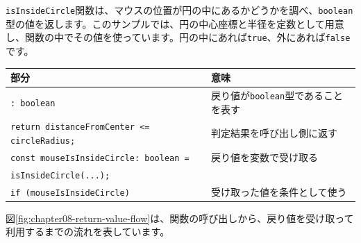 \begin{listing}[htbp]
\inputminted{ts}{typescript-p5/listings/chapter08/point-in-circle-function.ts}
\caption{点が円の中にあるかを返す関数（\texttt{chapter08/point-in-circle-function.ts}）}
\label{lst:chapter08-point-in-circle-function}
\end{listing}

\texttt{isInsideCircle}関数は、マウスの位置が円の中にあるかどうかを調べ、\texttt{boolean}型の値を返します。このサンプルでは、円の中心座標と半径を定数として用意し、関数の中でその値を使っています。円の中にあれば\texttt{true}、外にあれば\texttt{false}です。

{\footnotesize
\begin{center}
\begin{tabular}{ll}
\toprule
部分 & 意味 \\
\midrule
\texttt{: boolean} & 戻り値が\texttt{boolean}型であることを表す \\
\texttt{return distanceFromCenter <= circleRadius;} & 判定結果を呼び出し側に返す \\
\texttt{const mouseIsInsideCircle: boolean =} & 戻り値を変数で受け取る \\
\texttt{\quad isInsideCircle(...);} & \\
\texttt{if (mouseIsInsideCircle)} & 受け取った値を条件として使う \\
\bottomrule
\end{tabular}
\end{center}
}

図\ref{fig:chapter08-return-value-flow}は、関数の呼び出しから、戻り値を受け取って利用するまでの流れを表しています。

